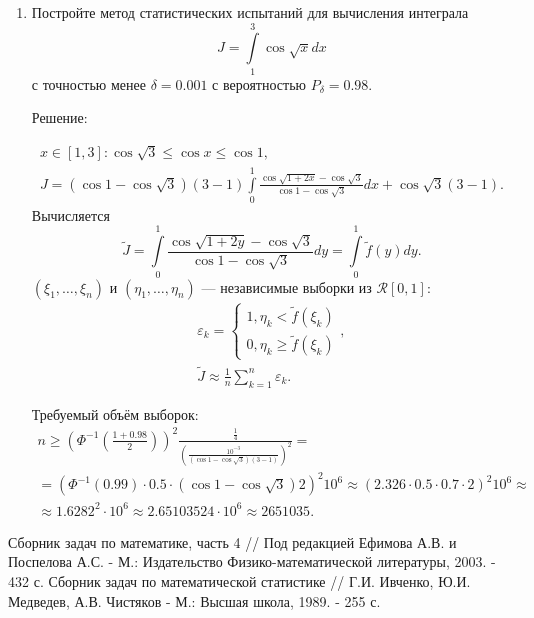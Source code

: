\documentclass[a4paper,12pt]{article}
\begin{document}
\begin{enumerate}
            \item Постройте метод статистических испытаний для вычисления интеграла
            \[
                  J = \int \limits_{1}^{3} \cos \sqrt{x} dx
            \]
            с точностью менее $\delta = 0.001$ с вероятностью $P_\delta = 0.98$.

            Решение:

            \begin{gather*}
                  x \in [1, 3]: \cos \sqrt{3} \le \cos x \le \cos 1 , \\
                  J
                  = \left( \cos 1 - \cos \sqrt{3} \right) (3 - 1) \int \limits_{0}^{1} \frac{\cos \sqrt{1 + 2 x} - \cos \sqrt{3}}{\cos 1 - \cos \sqrt{3}} dx + \cos \sqrt{3} (3 - 1).
            \end{gather*}
            Вычисляется
            \[
                  \widetilde{J}
                  = \int \limits_{0}^{1} \frac{\cos \sqrt{1 + 2 y} - \cos \sqrt{3}}{\cos 1 - \cos \sqrt{3}} dy
                  = \int \limits_{0}^{1} \widetilde{f}(y) dy .
            \]
            $(\xi_1, \dots, \xi_n)$ и $(\eta_1, \dots, \eta_n)$ --- независимые выборки из $\mathcal{R} [0, 1]$:
            \begin{gather*}
                  \varepsilon_k = \left \{
                  \begin{array}{ll}
                        1, \eta_k < \widetilde{f}(\xi_k) \\
                        0, \eta_k \ge \widetilde{f}(\xi_k)
                  \end{array}
                  \right . , \\
                  \widetilde{J} \approx \frac{1}{n} \sum_{k=1}^n \varepsilon_k .
            \end{gather*}

            Требуемый объём выборок:
            \begin{multline*}
                  n
                  \ge \left( \Phi^{-1} \left( \frac{1 + 0.98}{2} \right) \right)^2 \frac{\frac{1}{4}}{\left( \frac{10^{-3}}{\left( \cos 1 - \cos \sqrt{3} \right) (3 - 1)} \right)^2} = \\
                  = \left( \Phi^{-1} ( 0.99 ) \cdot 0.5 \cdot \left( \cos 1 - \cos \sqrt{3} \right) 2 \right)^2 10^6
                  \approx \left( 2.326 \cdot 0.5 \cdot 0.7 \cdot 2 \right)^2 10^6 \approx \\
                  \approx 1.6282^2 \cdot 10^6
                  \approx 2.65103524 \cdot 10^6
                  \approx 2 651 035 .
            \end{multline*}
\end{enumerate}

\begin{thebibliography}{2}
       Сборник задач по математике, часть 4 // Под редакцией Ефимова А.В. и Поспелова А.С. - М.: Издательство Физико-математической
      литературы, 2003. - 432 с.
       Сборник задач по математической статистике // Г.И. Ивченко, Ю.И. Медведев, А.В. Чистяков - М.: Высшая школа, 1989. - 255 с.
\end{thebibliography}
\end{document}
